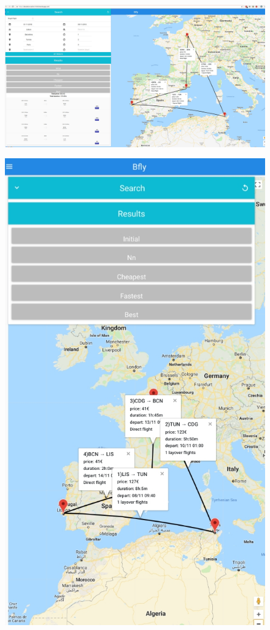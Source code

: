 \begin{figure}
\centering
\begin{minipage}{.7\textwidth}
  \centering
  \includegraphics[width=\linewidth]{./imgs/bfly_desktop.jpg}
  \label{fig:desktop_app}
\end{minipage}%
\begin{minipage}{.3\textwidth}
  \centering
  \includegraphics[width=0.75\linewidth]{./imgs/bfly_mobile.jpg}
  \label{fig:mobile_app}
\end{minipage}
\end{figure}

